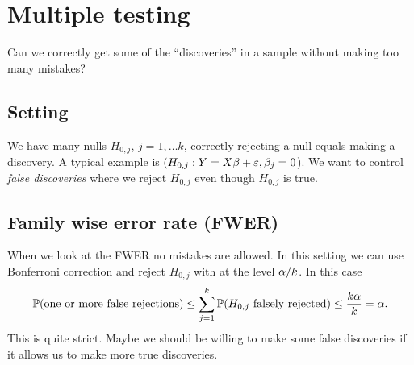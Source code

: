 \section{Multiple testing}
Can we correctly get some of the ``discoveries'' in a sample without making too many mistakes? 

\subsection{Setting}
We have many nulls $H_{0,j}$, $j=1,\ldots k$, correctly rejecting a null equals making a discovery. A typical example is $(H_{0,j}:Y=X\beta+\varepsilon, \beta_j = 0$). We want to control \emph{false discoveries} where we reject $H_{0,j}$ even though $H_{0,j}$ is true.

\subsection{Family wise error rate (FWER)}
When we look at the FWER no mistakes are allowed. In this setting we can use Bonferroni correction and reject $H_{0,j}$ with at the level ${\alpha}/k$. In this case
\[{\mathbb{P}}(\text{one or more false rejections}) \le \sum_{j=1}^k {\mathbb{P}}(H_{0,j} \text{ falsely rejected}) \le \frac{k{\alpha}}{k} = {\alpha}. \]
This is quite strict. Maybe we should be willing to make some false discoveries if it allows us to make more true discoveries.

